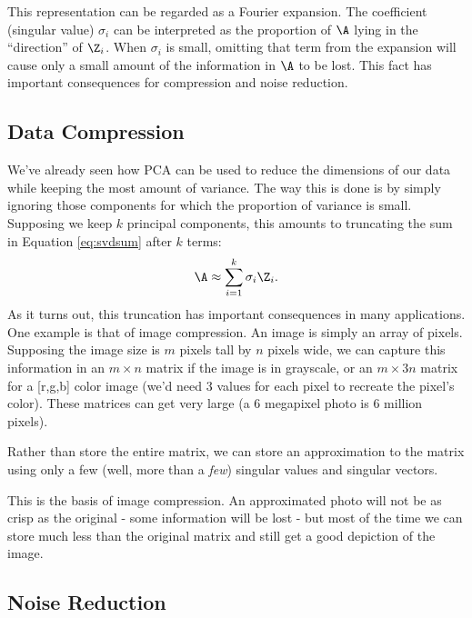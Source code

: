 \documentclass[
]{article}
\theoremstyle{definition}
\theoremstyle{definition}
\theoremstyle{definition}
\theoremstyle{definition}
\theoremstyle{remark}
\begin{document}
This representation can be regarded as a Fourier expansion. The coefficient (singular value) \(\sigma_i\) can be interpreted as the proportion of \(\A\) lying in the ``direction'' of \(\Z_i\). When \(\sigma_i\) is small, omitting that term from the expansion will cause only a small amount of the information in \(\A\) to be lost. This fact has important consequences for compression and noise reduction.

\hypertarget{data-compression}{%
\subsection{Data Compression}\label{data-compression}}

We've already seen how PCA can be used to reduce the dimensions of our data while keeping the most amount of variance. The way this is done is by simply ignoring those components for which the proportion of variance is small. Supposing we keep \(k\) principal components, this amounts to truncating the sum in Equation \eqref{eq:svdsum} after \(k\) terms:
\begin{equation}
\label{eq:truncsvd}
\A \approx \sum_{i=1}^{k} \sigma_i \Z_i.
\end{equation}
As it turns out, this truncation has important consequences in many applications. One example is that of image compression. An image is simply an array of pixels. Supposing the image size is \(m\) pixels tall by \(n\) pixels wide, we can capture this information in an \(m\times n\) matrix if the image is in grayscale, or an \(m\times 3n\) matrix for a {[}r,g,b{]} color image (we'd need 3 values for each pixel to recreate the pixel's color). These matrices can get very large (a 6 megapixel photo is 6 million pixels).

Rather than store the entire matrix, we can store an approximation to the matrix using only a few (well, more than a \emph{few}) singular values and singular vectors.

This is the basis of image compression. An approximated photo will not be as crisp as the original - some information will be lost - but most of the time we can store much less than the original matrix and still get a good depiction of the image.

\hypertarget{noise-reduction}{%
\subsection{Noise Reduction}\label{noise-reduction}}
\end{document}
